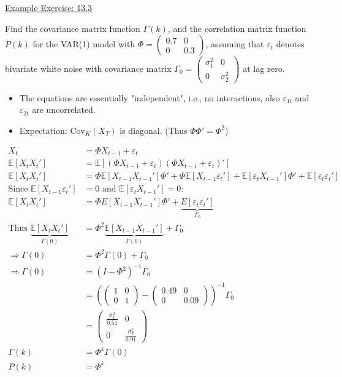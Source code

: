 \underline{Example Exercise: 13.3}\\

\begin{footnotesize}
Find the covariance matrix function $\Gamma(k)$, and the correlation matrix function $P(k)$ for the VAR(1) model with $\Phi= \begin{pmatrix}
    0.7 & 0\\
    0& 0.3
\end{pmatrix}$, assuming that $\varepsilon_t$ denotes bivariate white noise with covariance matrix $\Gamma_0 = \begin{pmatrix}
    \sigma_1^2 & 0\\
    0& \sigma_2^2
\end{pmatrix}$ at lag zero. \\

\begin{itemize}
    \item The equations are essentially "independent", i.e., no interactions, also \(\varepsilon_{1t}\) and \(\varepsilon_{2t}\) are uncorrelated.
    \item Expectation: \(\text{Cov}_K(X_T)\) is diagonal. (Thus $\Phi \Phi'=\Phi^2$)
\end{itemize}
\begin{align*}
    X_t &= \Phi X_{t-1} + \varepsilon_t \\
\mathbb{E}[X_t X_t'] &= \mathbb{E}[(\Phi X_{t-1} + \varepsilon_t)(\Phi X_{t-1} + \varepsilon_t)']\\
\mathbb{E}[X_t X_t'] &= \Phi \mathbb{E}[X_{t-1} X_{t-1}'] \Phi' + \Phi \mathbb{E}[X_{t-1} \varepsilon_t'] + \mathbb{E}[\varepsilon_t X_{t-1}'] \Phi' + \mathbb{E}[\varepsilon_t \varepsilon_t']\\
\text{Since } \mathbb{E}[X_{t-1} \varepsilon_t'] &= 0 \text{ and } \mathbb{E}[\varepsilon_t X_{t-1}'] = 0: \\
\mathbb{E}[X_t X_t'] &= \Phi E[X_{t-1} X_{t-1}'] \Phi' + \underbrace{E[\varepsilon_t \varepsilon_t']}_{\Gamma_0}\\
\text{Thus } \underbrace{\mathbb{E}[X_tX_t']}_{\Gamma(0)} &= \Phi^2 \underbrace{\mathbb{E}[X_{t-1}X_{t-1}']}_{\Gamma(0)} + \Gamma_0\\
\Rightarrow \Gamma(0) &= \Phi^2 \Gamma(0) + \Gamma_0\\
\Rightarrow \Gamma(0) &= (I- \Phi^2)^{-1} \Gamma_0\\
&= \left(\begin{pmatrix}
    1&0\\
    0&1
\end{pmatrix} - \begin{pmatrix}
    0.49 & 0\\
    0 & 0.09
\end{pmatrix} \right)^{-1} \Gamma_0 \\
&= \begin{pmatrix}
    \frac{\sigma^2_1}{0.51} & 0\\
    0& \frac{\sigma_2^2}{0.91}
\end{pmatrix}\\
 \Gamma(k)&=\Phi^k \Gamma(0)\\
P(k)&=\Phi^k
\end{align*}
\end{footnotesize}


